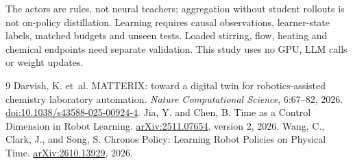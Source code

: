 \documentclass{article}
\begin{document}
The actors are rules, not neural teachers; aggregation without student
rollouts is not on-policy distillation. Learning requires causal
observations, learner-state labels, matched budgets and unseen tests.
Loaded stirring, flow, heating and chemical endpoints need separate
validation. This study uses no GPU, LLM calls or weight updates.

\begin{thebibliography}{9}
Darvish, K. et~al. MATTERIX: toward a digital twin for robotics-assisted
chemistry laboratory automation. \emph{Nature Computational Science},
6:67--82, 2026.
\href{https://doi.org/10.1038/s43588-025-00924-4}{doi:10.1038/s43588-025-00924-4}.
Jia, Y. and Chen, B. Time as a Control Dimension in Robot Learning.
\href{https://arxiv.org/abs/2511.07654}{arXiv:2511.07654}, version 2, 2026.
Wang, C., Clark, J., and Song, S.
Chronos Policy: Learning Robot Policies on Physical Time.
\href{https://arxiv.org/abs/2610.13929}{arXiv:2610.13929}, 2026.
\end{thebibliography}
\end{document}
